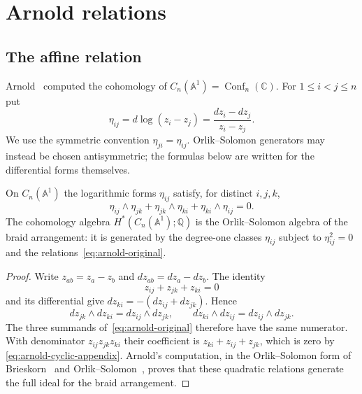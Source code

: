 \chapter{Arnold relations}\label{app:arnold-relations}

\section{The affine relation}
\label{sec:arnold-historical}

Arnold~\cite{Arnold69} computed the cohomology of
$C_n(\mathbb{A}^1)=\operatorname{Conf}_n(\mathbb{C})$. For
$1\leq i<j\leq n$ put
\[
\eta_{ij}=d\log(z_i-z_j)=\frac{dz_i-dz_j}{z_i-z_j}.
\]
We use the symmetric convention
$\eta_{ji}=\eta_{ij}$. Orlik--Solomon generators may instead be
chosen antisymmetric; the formulas below are written for the
differential forms themselves.

\begin{theorem}
\label{thm:arnold-relations-appendix}
On $C_n(\mathbb{A}^1)$ the logarithmic forms $\eta_{ij}$ satisfy, for
distinct $i,j,k$,
\begin{equation}\label{eq:arnold-original}
\eta_{ij}\wedge\eta_{jk}
+\eta_{jk}\wedge\eta_{ki}
+\eta_{ki}\wedge\eta_{ij}=0.
\end{equation}
The cohomology algebra $H^*(C_n(\mathbb{A}^1);\mathbb{Q})$ is the
Orlik--Solomon algebra of the braid arrangement: it is generated by
the degree-one classes $\eta_{ij}$ subject to
$\eta_{ij}^2=0$ and the relations~\eqref{eq:arnold-original}.
\end{theorem}

\begin{proof}
Write $z_{ab}=z_a-z_b$ and $dz_{ab}=dz_a-dz_b$. The identity
\begin{equation}\label{eq:arnold-cyclic-appendix}
z_{ij}+z_{jk}+z_{ki}=0
\end{equation}
and its differential give
$dz_{ki}=-(dz_{ij}+dz_{jk})$. Hence
\[
dz_{jk}\wedge dz_{ki}=dz_{ij}\wedge dz_{jk},
\qquad
dz_{ki}\wedge dz_{ij}=dz_{ij}\wedge dz_{jk}.
\]
The three summands of~\eqref{eq:arnold-original} therefore have the
same numerator. With denominator $z_{ij}z_{jk}z_{ki}$ their coefficient
is $z_{ki}+z_{ij}+z_{jk}$, which is zero by
\eqref{eq:arnold-cyclic-appendix}. Arnold's computation, in the
Orlik--Solomon form of Brieskorn~\cite{Brieskorn73} and
Orlik--Solomon~\cite{OS80}, proves that these quadratic relations
generate the full ideal for the braid arrangement.
\end{proof}

